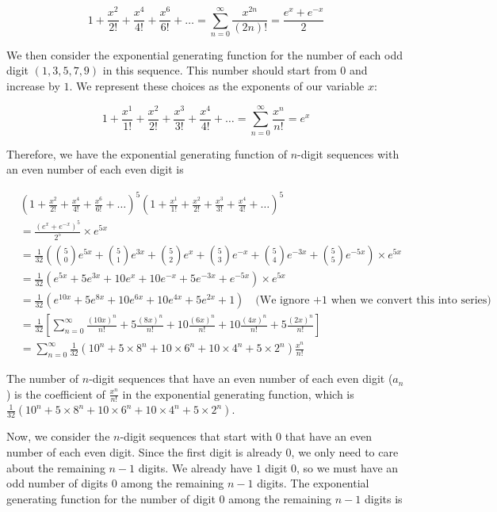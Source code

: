 \documentclass[10pt]{article}
\begin{document}
\begin{enumerate}
$$1 + \frac{x^2}{2!}+\frac{x^4}{4!} + \frac{x^6}{6!} +\ldots=\sum\limits^{\infty}_{n=0}\frac{x^{2n}}{(2n)!}=\frac{e^x+e^{-x}}{2}$$

We then consider the exponential generating function for the number of each odd digit $(1,3,5,7,9)$ in this sequence. This number should start from $0$ and increase by $1$. We represent these choices as the exponents of our variable $x$:

$$1 + \frac{x^1}{1!} + \frac{x^2}{2!}+ \frac{x^3}{3!}+\frac{x^4}{4!}  +\ldots=\sum\limits^{\infty}_{n=0}\frac{x^n}{n!}=e^x$$

Therefore, we have the exponential generating function of $n$-digit sequences with an even number of each even digit is

\begin{align*}
    &\left(1 + \frac{x^2}{2!}+\frac{x^4}{4!} + \frac{x^6}{6!} +\ldots\right)^5\left(1 + \frac{x^1}{1!} + \frac{x^2}{2!}+ \frac{x^3}{3!}+\frac{x^4}{4!}  +\ldots\right)^5 \\
    &=\frac{(e^x+e^{-x})^5}{2^5} \times e^{5x}\\
    &= \frac{1}{32} \left( \binom{5}{0}e^{5x} + \binom{5}{1}e^{3x} + \binom{5}{2}e^{x} + \binom{5}{3}e^{-x} + \binom{5}{4}e^{-3x} + \binom{5}{5}e^{-5x} \right) \times e^{5x} \\
    &= \frac{1}{32} \left( e^{5x} + 5e^{3x} + 10e^{x} + 10e^{-x} + 5e^{-3x} + e^{-5x} \right) \times e^{5x} \\
    &= \frac{1}{32} \left( e^{10x} + 5e^{8x} + 10e^{6x} + 10e^{4x} + 5e^{2x} + 1 \right)\quad \text{(We ignore $+1$ when we convert this into series)}\\
    &= \frac{1}{32} \left[\sum\limits_{n=0}^{\infty}\frac{(10x)^n}{n!} + 5\frac{(8x)^n}{n!}+10\frac{(6x)^n}{n!}+10\frac{(4x)^n}{n!}+5\frac{(2x)^n}{n!}\right]\\
    &=\sum\limits_{n=0}^{\infty}\frac{1}{32} \left(10^n+ 5\times 8^n+10 \times 6^n+10\times 4^n+5\times 2^n\right)\frac{x^n}{n!}
\end{align*}

The number of $n$-digit sequences that have an even number of each even digit ($a_n$) is the coefficient of $\frac{x^n}{n!}$ in the exponential generating function, which is $\frac{1}{32} \left(10^n+ 5\times 8^n+10 \times 6^n+10\times 4^n+5\times 2^n\right)$.

Now, we consider the $n$-digit sequences that start with $0$ that have an even number of each even digit. Since the first digit is already $0$, we only need to care about the remaining $n-1$ digits. We already have $1$ digit $0$, so we must have an odd number of digits $0$ among the remaining $n-1$ digits. The exponential generating function for the number of digit $0$ among the remaining $n-1$ digits is


\end{enumerate}
\end{document}
